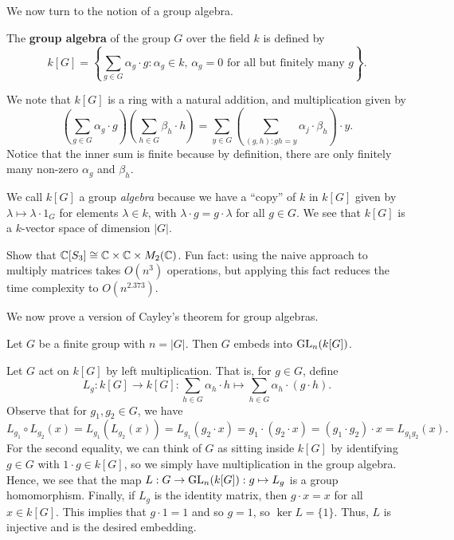We now turn to the notion of a group algebra.

\begin{defn}
The {\bf group algebra} of the group $G$ over the field $k$ is defined by 
\[ k[G] = \left\{ \sum_{g\in G} \alpha_g \cdot g : \alpha_g \in k,\, \alpha_g = 0 \text{ for all but 
finitely many $g$} \right\}. \]
\end{defn}

We note that $k[G]$ is a ring with a natural addition, and multiplication given by 
\[ \left( \sum_{g\in G} \alpha_g \cdot g \right) \left( \sum_{h \in G} \beta_h \cdot h \right) 
= \sum_{y \in G} \left( \sum_{(g, h) : gh = y} \alpha_j \cdot \beta_h \right) \cdot y. \]
Notice that the inner sum is finite because by definition, there are only finitely many 
non-zero $\alpha_g$ and $\beta_h$. 

\begin{remark}
We call $k[G]$ a group {\it algebra} because we have a ``copy'' of $k$ in $k[G]$ given by 
$\lambda \mapsto \lambda \cdot 1_G$ for elements $\lambda \in k$, with $\lambda \cdot g = g 
\cdot \lambda$ for all $g \in G$. We see that $k[G]$ is a $k$-vector space of dimension $|G|$. 
\end{remark}

\begin{exercise}
Show that $\mathbb{C}[S_3] \cong \mathbb{C} \times \mathbb{C} \times M_2(\mathbb{C})$. Fun fact: using the naive approach 
to multiply matrices takes $O(n^3)$ operations, but applying this fact reduces the time complexity to 
$O(n^{2.373})$. 
\end{exercise}

We now prove a version of Cayley's theorem for group algebras. 

\begin{prop}
Let $G$ be a finite group with $n = |G|$. Then $G$ embeds into $\operatorname{GL}_n(k[G])$. 
\end{prop}
\begin{pf}
Let $G$ act on $k[G]$ by left multiplication. That is, for $g \in G$, define 
\[ L_g : k[G] \to k[G] : \sum_{h\in G} \alpha_h \cdot h \mapsto \sum_{h\in G} \alpha_h \cdot (g \cdot h). \]
Observe that for $g_1, g_2 \in G$, we have 
\[ L_{g_1} \circ L_{g_2}(x) = L_{g_1}(L_{g_2}(x)) = L_{g_1}(g_2 \cdot x) = g_1 \cdot (g_2 \cdot x)
= (g_1 \cdot g_2) \cdot x = L_{g_1g_2}(x). \] 
For the second equality, we can think of $G$ as sitting inside $k[G]$ by identifying 
$g \in G$ with $1 \cdot g \in k[G]$, so we simply have multiplication in the group algebra. 
Hence, we see that the map $L : G \to \operatorname{GL}_n(k[G]) : g \mapsto L_g$ is a group homomorphism. Finally, if 
$L_g$ is the identity matrix, then $g \cdot x = x$ for all $x \in k[G]$. This implies that 
$g \cdot 1 = 1$ and so $g = 1$, so $\ker L = \{1\}$. Thus, $L$ is injective and is the desired embedding.
\end{pf}

